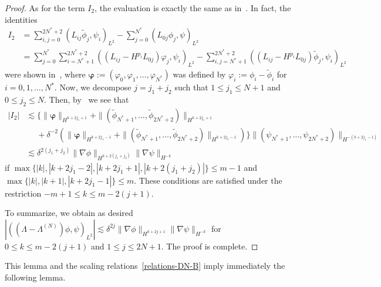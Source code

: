 \documentclass[11pt,leqno]{article}
\numberwithin{equation}{section}
\numberwithin{figure}{section}
\begin{document}
\begin{proof}
As for the term $I_2$, the evaluation is exactly the same as in~\cite{Iguchi2018-2}. 
In fact, the identities 
%
\begin{align*}
I_2 &= \sum_{i,j=0}^{2N^*+2}(L_{ij}\tilde{\phi}_j, \psi_i)_{L^2} - \sum_{j=0}^{N^*}(L_{0j}\phi_j, \psi)_{L^2} \\
&= \sum_{j=0}^{N^*}\sum_{i=N^*+1}^{2N^*+2}((L_{ij}-H^{p_i}L_{0j})\varphi_j,\psi_i)_{L^2}
 - \sum_{i,j=N^*+1}^{2N^*+2}((L_{ij}-H^{p_i}L_{0j})\tilde{\phi}_j,\psi_i)_{L^2}
\end{align*}
%
were shown in~\cite[Equation (7.7)]{Iguchi2018-2}, 
where $\bm{\varphi}:=(\varphi_0,\varphi_1,\ldots,\varphi_{N^*})$ was defined by 
$\varphi_i:=\phi_i-\tilde{\phi}_i$ for $i=0,1,\ldots,N^*$. 
Now, we decompose $j=j_1+j_2$ such that $1\leq j_1\leq N+1$ and $0\leq j_2\leq N$. 
Then, by~\cite[Lemmas 5.2, 5.4, 6.2 and 6.7]{Iguchi2018-2} we see that 
%
\begin{align*}
|I_2| &\lesssim \{
 \|\bm{\varphi}\|_{H^{k+2j_1+1}}+\|(\tilde{\phi}_{N^*+1},\ldots,\tilde{\phi}_{2N^*+2})\|_{H^{k+2j_1+1}} \\
&\quad\;
 +\delta^{-2}(\|\bm{\varphi}\|_{H^{k+2j_1-1}}+\|(\tilde{\phi}_{N^*+1},\ldots,\tilde{\phi}_{2N^*+2})\|_{H^{k+2j_1-1}}) \}
 \|(\psi_{N^*+1},\ldots,\psi_{2N^*+2})\|_{H^{-(k+2j_1-1)}} \\
&\lesssim
 \delta^{2(j_1+j_2)}\|\nabla\phi\|_{H^{k+2(j_1+j_2)}}\|\nabla\psi\|_{H^{-k}}
\end{align*}
%
if $\max\{|k|,|k+2j_1-2|,|k+2j_1+1|,|k+2(j_1+j_2)|\} \leq m-1$ and $\max\{|k|,|k+1|,|k+2j_1-1|\}\leq m$. 
These conditions are satisfied under the restriction $-m+1\leq k\leq m-2(j+1)$.


To summarize, we obtain as desired
$|((\Lambda-\Lambda^{(N)})\phi,\psi)_{L^2}| \lesssim \delta^{2j}\|\nabla \phi\|_{H^{k+2j+1}} \|\nabla\psi\|_{H^{-k}}$ 
for $0\leq k\leq m-2(j+1)$ and $1\leq j\leq 2N+1$. 
The proof is complete. 
\end{proof}


This lemma and the scaling relations~\eqref{relations-DN-B} imply immediately the following lemma. 
\end{document}
